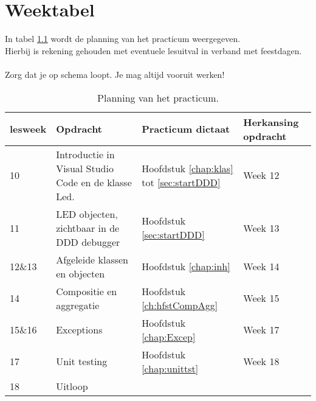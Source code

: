 \chapter{Weektabel}

In tabel \ref{tabel:wkplan} wordt de planning van het practicum weergegeven.\\
Hierbij is rekening gehouden met eventuele lesuitval in verband met feestdagen.\\~\\
Zorg dat je op schema loopt. Je mag altijd vooruit werken!
\begin{table}[h!]
	\begin{tabular}{ | m{1.5cm} | m{7cm} |p{2.6cm}|p{3cm}| } 
		\hline
lesweek &Opdracht & Practicum dictaat &Herkansing opdracht \\ \hline
	10	& Introductie in Visual Studio Code en de klasse Led. & Hoofdstuk \ref{chap:klas} tot \ref{sec:startDDD}& Week 12\\ \hline
	11	&   LED objecten, zichtbaar in de DDD debugger &  Hoofdstuk \ref{sec:startDDD}&Week 13 \\ \hline
	12\&13	&  Afgeleide klassen en objecten & Hoofdstuk \ref{chap:inh} &Week 14\\ \hline
	14	&Compositie en aggregatie    & Hoofdstuk \ref{ch:hfstCompAgg}&Week 15 \\ \hline
	15\&16	& Exceptions   & Hoofdstuk \ref{chap:Excep}& Week 17 \\ \hline
	17	&Unit testing  & Hoofdstuk \ref{chap:unittst} & Week 18\\ \hline	
	18 &Uitloop& &\\ \hline
	\end{tabular}  
    \caption{Planning van het practicum.}
    \label{tabel:wkplan}
\end{table}

